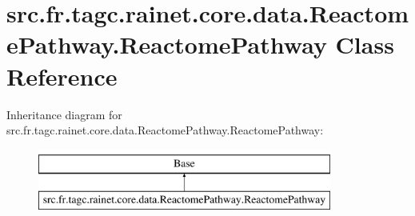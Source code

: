 \hypertarget{classsrc_1_1fr_1_1tagc_1_1rainet_1_1core_1_1data_1_1ReactomePathway_1_1ReactomePathway}{\section{src.\-fr.\-tagc.\-rainet.\-core.\-data.\-Reactome\-Pathway.\-Reactome\-Pathway Class Reference}
\label{classsrc_1_1fr_1_1tagc_1_1rainet_1_1core_1_1data_1_1ReactomePathway_1_1ReactomePathway}
}
Inheritance diagram for src.\-fr.\-tagc.\-rainet.\-core.\-data.\-Reactome\-Pathway.\-Reactome\-Pathway\-:\begin{figure}[H]
\begin{center}
\leavevmode
\includegraphics[height=2.000000cm]{classsrc_1_1fr_1_1tagc_1_1rainet_1_1core_1_1data_1_1ReactomePathway_1_1ReactomePathway}
\end{center}
\end{figure}
